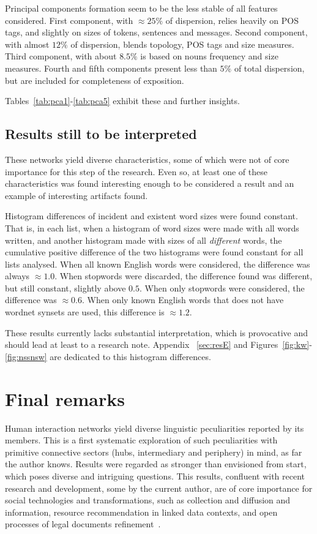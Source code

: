 \documentclass[%
 aip,
 jmp,%
 amsmath,amssymb,
 reprint,%
]{revtex4-1}
\begin{document}
Principal components formation seem to be the less stable of all features considered. First component, with $\approx 25\%$ of dispersion, relies heavily on POS tags, and slightly on sizes of tokens, sentences and messages. Second component, with almost $12\%$ of dispersion, blends topology, POS tags and size measures. Third component, with about $8.5\%$ is based on nouns frequency and size measures. Fourth and fifth components present less than $5\%$ of total dispersion, but are included for completeness of exposition.

Tables~\ref{tab:pca1}-\ref{tab:pca5} exhibit these and further insights.

\subsection{Results still to be interpreted}\label{subsec:sii}
These networks yield diverse characteristics, some of which were not of core importance for this step of the research. Even so, at least one of these characteristics was found interesting enough to be considered a result and an example of interesting artifacts found.

Histogram differences of incident and existent word sizes were found constant. That is, in each list, when a histogram of word sizes were made with all words written, and another histogram made with sizes of all \emph{different} words, the cumulative positive difference of the two histograms were found constant for all lists analysed. When all known English words were considered, the difference was always $\approx 1.0$. When stopwords were discarded, the difference found was different, but still constant, slightly above $0.5$. When only stopwords were considered, the difference was $\approx 0.6$. When only known English words that does not have wordnet synsets are used, this difference is $\approx 1.2$.

These results currently lacks substantial interpretation, which is provocative and should lead at least to a research note. Appendix ~\ref{sec:resE} and Figures~\ref{fig:kw}-\ref{fig:nssnsw} are dedicated to this histogram differences.



\section{Final remarks}\label{sec:remarks}
Human interaction networks yield diverse linguistic peculiarities reported by its members. This is a first systematic exploration of such peculiarities with primitive connective sectors (hubs, intermediary and periphery) in mind, as far the author knows. Results were regarded as stronger than envisioned from start, which poses diverse and intriguing questions.
This results, confluent with recent research and development, some by the current author, are of core importance for social technologies and transformations, such as collection and diffusion and information, resource recommendation in linked data contexts, and open processes of legal documents refinement~\cite{ensaio,OPS,pnud5,evoSN,pbr}.
\end{document}
